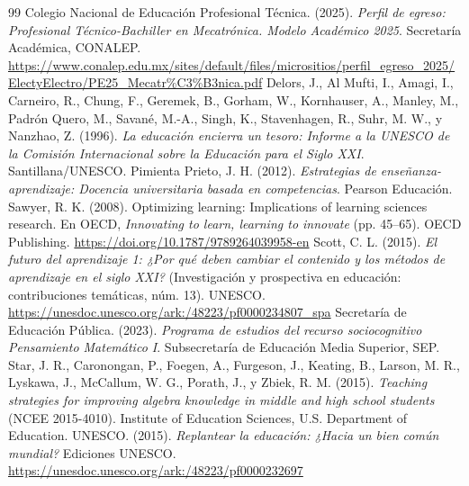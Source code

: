 \documentclass[spanish,letterpaper,oneside]{article}
\begin{document}
\clearpage
\begin{thebibliography}{99}
 Colegio Nacional de Educación Profesional Técnica. (2025). \textit{Perfil de egreso: Profesional Técnico-Bachiller en Mecatrónica. Modelo Académico 2025}. Secretaría Académica, CONALEP. \url{https://www.conalep.edu.mx/sites/default/files/micrositios/perfil_egreso_2025/ElectyElectro/PE25_Mecatr%C3%B3nica.pdf}
 Delors, J., Al Mufti, I., Amagi, I., Carneiro, R., Chung, F., Geremek, B., Gorham, W., Kornhauser, A., Manley, M., Padrón Quero, M., Savané, M.-A., Singh, K., Stavenhagen, R., Suhr, M. W., y Nanzhao, Z. (1996). \textit{La educación encierra un tesoro: Informe a la UNESCO de la Comisión Internacional sobre la Educación para el Siglo XXI}. Santillana/UNESCO.
 Pimienta Prieto, J. H. (2012). \textit{Estrategias de enseñanza-aprendizaje: Docencia universitaria basada en competencias}. Pearson Educación.
 Sawyer, R. K. (2008). Optimizing learning: Implications of learning sciences research. En OECD, \textit{Innovating to learn, learning to innovate} (pp. 45--65). OECD Publishing. \url{https://doi.org/10.1787/9789264039958-en}
 Scott, C. L. (2015). \textit{El futuro del aprendizaje 1: ¿Por qué deben cambiar el contenido y los métodos de aprendizaje en el siglo XXI?} (Investigación y prospectiva en educación: contribuciones temáticas, núm. 13). UNESCO. \url{https://unesdoc.unesco.org/ark:/48223/pf0000234807_spa}
 Secretaría de Educación Pública. (2023). \textit{Programa de estudios del recurso sociocognitivo Pensamiento Matemático I}. Subsecretaría de Educación Media Superior, SEP.
 Star, J. R., Caronongan, P., Foegen, A., Furgeson, J., Keating, B., Larson, M. R., Lyskawa, J., McCallum, W. G., Porath, J., y Zbiek, R. M. (2015). \textit{Teaching strategies for improving algebra knowledge in middle and high school students} (NCEE 2015-4010). Institute of Education Sciences, U.S. Department of Education.
 UNESCO. (2015). \textit{Replantear la educación: ¿Hacia un bien común mundial?} Ediciones UNESCO. \url{https://unesdoc.unesco.org/ark:/48223/pf0000232697}
\end{thebibliography}
\end{document}
